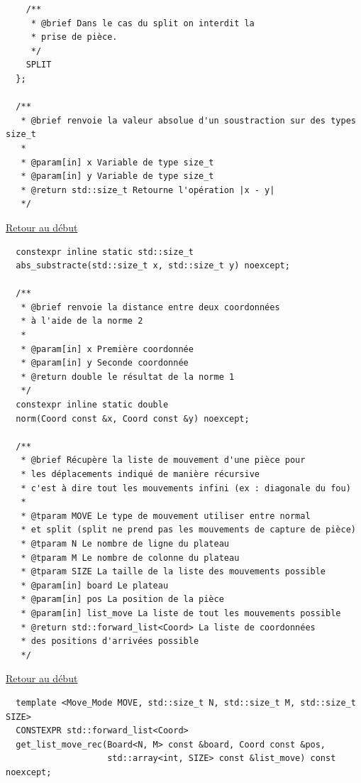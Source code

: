 {\begin{frame}[fragile]
\begin{verbatim}
    /**
     * @brief Dans le cas du split on interdit la
     * prise de pièce.
     */
    SPLIT
  };

  /**
   * @brief renvoie la valeur absolue d'un soustraction sur des types size_t
   *
   * @param[in] x Variable de type size_t
   * @param[in] y Variable de type size_t
   * @return std::size_t Retourne l'opération |x - y|
   */
\end{verbatim}
\end{frame}

\begin{frame}[fragile]
\hyperlink{conclusion}{Retour au début}\newline
\begin{verbatim}
  constexpr inline static std::size_t
  abs_substracte(std::size_t x, std::size_t y) noexcept;

  /**
   * @brief renvoie la distance entre deux coordonnées
   * à l'aide de la norme 2
   *
   * @param[in] x Première coordonnée
   * @param[in] y Seconde coordonnée
   * @return double le résultat de la norme 1
   */
  constexpr inline static double
  norm(Coord const &x, Coord const &y) noexcept;

  /**
   * @brief Récupère la liste de mouvement d'une pièce pour
   * les déplacements indiqué de manière récursive
   * c'est à dire tout les mouvements infini (ex : diagonale du fou)
   *
   * @tparam MOVE Le type de mouvement utiliser entre normal
   * et split (split ne prend pas les mouvements de capture de pièce)
   * @tparam N Le nombre de ligne du plateau
   * @tparam M Le nombre de colonne du plateau
   * @tparam SIZE La taille de la liste des mouvements possible
   * @param[in] board Le plateau
   * @param[in] pos La position de la pièce
   * @param[in] list_move La liste de tout les mouvements possible
   * @return std::forward_list<Coord> La liste de coordonnées
   * des positions d'arrivées possible
   */
\end{verbatim}
\end{frame}

\begin{frame}[fragile]
\hyperlink{conclusion}{Retour au début}\newline
\begin{verbatim}
  template <Move_Mode MOVE, std::size_t N, std::size_t M, std::size_t SIZE>
  CONSTEXPR std::forward_list<Coord>
  get_list_move_rec(Board<N, M> const &board, Coord const &pos,
                    std::array<int, SIZE> const &list_move) const noexcept;


\end{verbatim}
\end{frame}}

